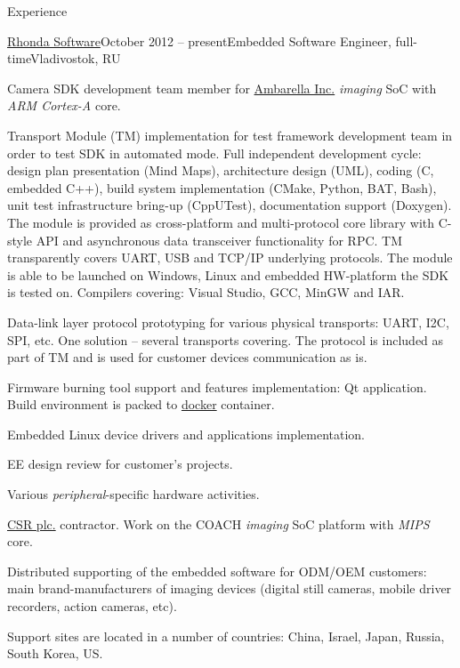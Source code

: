 \documentclass{template}
\begin{document}
\begin{rSection}{Experience}
\begin{rCompany}{\href{http://www.rhondasoftware.com}{Rhonda Software}}{October 2012 -- present}{Embedded Software Engineer, full-time}{Vladivostok, RU}

\item Camera SDK development team member for \href{http://www.ambarella.com}{Ambarella Inc.} \textit{imaging} SoC with \textit{ARM Cortex-A} core.
\item Transport Module (TM) implementation for test framework development team in order to test SDK in automated mode. Full independent development
      cycle: design plan presentation (Mind Maps), architecture design (UML), coding (C, embedded C++), build system implementation (CMake, Python,
      BAT, Bash), unit test infrastructure bring-up (CppUTest), documentation support (Doxygen). The module is provided as cross-platform and
      multi-protocol core library with C-style API and asynchronous data transceiver functionality for RPC. TM transparently covers UART, USB and
      TCP/IP underlying protocols. The module is able to be launched on Windows, Linux and embedded HW-platform the SDK is tested on. Compilers
      covering: Visual Studio, GCC, MinGW and IAR.
\item Data-link layer protocol prototyping for various physical transports: UART, I2C, SPI, etc. One solution -- several transports covering.
      The protocol is included as part of TM and is used for customer devices communication as is.
\item Firmware burning tool support and features implementation: Qt application. Build environment is packed to \href{www.docker.com}{docker}
      container.
\item Embedded Linux device drivers and applications implementation.
\item EE design review for customer's projects.
\item Various \textit{peripheral}-specific hardware activities. \newline
\item \href{http://www.csr.com}{CSR plc.} contractor. Work on the COACH \textit{imaging} SoC platform with \textit{MIPS} core.
\item Distributed supporting of the embedded software for ODM/OEM customers: main brand-manufacturers of imaging devices (digital still cameras,
      mobile driver recorders, action cameras, etc).
\item Support sites are located in a number of countries: China, Israel, Japan, Russia, South Korea, US.

\end{rCompany}
\end{rSection}
\end{document}
